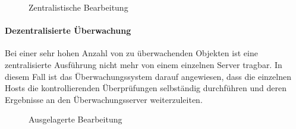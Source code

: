\begin{figure}[ht]
	\centering
		\caption[Zentralistische Bearbeitung]{Zentralistische Bearbeitung}
		\label{distmon2}
\end{figure}


\paragraph{Dezentralisierte Überwachung}
Bei einer sehr hohen Anzahl von zu überwachenden Objekten ist eine zentralisierte Ausführung nicht mehr von einem einzelnen Server tragbar.
In diesem Fall ist das Überwachungssystem darauf angewiesen, dass die einzelnen Hosts die kontrollierenden Überprüfungen selbständig durchführen und deren Ergebnisse an den Überwachungsserver weiterzuleiten.


\begin{figure}[ht]
	\centering
		\caption{Ausgelagerte Bearbeitung}
		\label{distmonp}
\end{figure}

